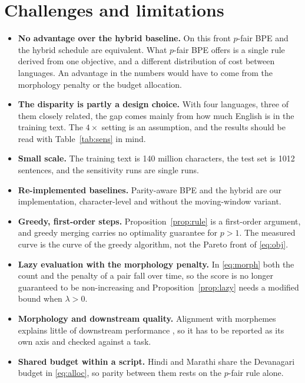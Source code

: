 \documentclass[11pt,a4paper]{article}
\theoremstyle{remark}
\begin{document}
\section{Challenges and limitations}

\begin{itemize}
  \item \textbf{No advantage over the hybrid baseline.} On this front $p$-fair BPE and the
  hybrid schedule are equivalent. What $p$-fair BPE offers is a single rule derived from
  one objective, and a different distribution of cost between languages. An advantage in
  the numbers would have to come from the morphology penalty or the budget allocation.
  \item \textbf{The disparity is partly a design choice.} With four languages, three of
  them closely related, the gap comes mainly from how much English is in the training text.
  The $4\times$ setting is an assumption, and the results should be read with
  Table~\ref{tab:sens} in mind.
  \item \textbf{Small scale.} The training text is 140 million characters, the test set is
  1012 sentences, and the sensitivity runs are single runs.
  \item \textbf{Re-implemented baselines.} Parity-aware BPE and the hybrid are our
  implementation, character-level and without the moving-window variant.
  \item \textbf{Greedy, first-order steps.} Proposition~\ref{prop:rule} is a first-order
  argument, and greedy merging carries no optimality guarantee for $p>1$. The measured
  curve is the curve of the greedy algorithm, not the Pareto front of \eqref{eq:obj}.
  \item \textbf{Lazy evaluation with the morphology penalty.} In \eqref{eq:morph} both the
  count and the penalty of a pair fall over time, so the score is no longer guaranteed to be
  non-increasing and Proposition~\ref{prop:lazy} needs a modified bound when $\lambda>0$.
  \item \textbf{Morphology and downstream quality.} Alignment with morphemes explains little
  of downstream performance \cite{arnett2025}, so it has to be reported as its own axis and
  checked against a task.
  \item \textbf{Shared budget within a script.} Hindi and Marathi share the Devanagari
  budget in \eqref{eq:alloc}, so parity between them rests on the $p$-fair rule alone.
\end{itemize}

\end{document}
